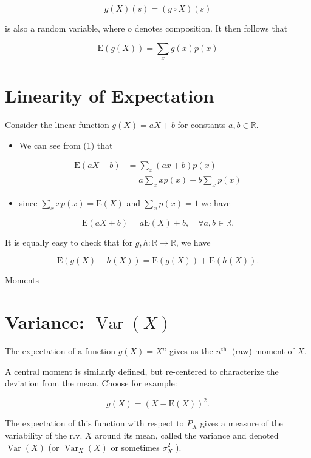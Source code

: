 \documentclass[10pt]{article}
\begin{document}
$$
g(X)(s)=(g \circ X)(s)
$$

is also a random variable, where o denotes composition. It then follows that


\begin{equation*}
\mathrm{E}(g(X))=\sum_{x} g(x) p(x) \tag{1}
\end{equation*}


\section*{Linearity of Expectation}
Consider the linear function $g(X)=a X+b$ for constants $a, b \in \mathbb{R}$.

\begin{itemize}
  \item We can see from (1) that
\end{itemize}

$$
\begin{aligned}
\mathrm{E}(a X+b) & =\sum_{x}(a x+b) p(x) \\
& =a \sum_{x} x p(x)+b \sum_{x} p(x)
\end{aligned}
$$

\begin{itemize}
  \item since $\sum_{x} x p(x)=\mathrm{E}(X)$ and $\sum_{x} p(x)=1$ we have
\end{itemize}

$$
\mathrm{E}(a X+b)=a \mathrm{E}(X)+b, \quad \forall a, b \in \mathbb{R} .
$$

It is equally easy to check that for $g, h: \mathbb{R} \rightarrow \mathbb{R}$, we have

$$
\mathrm{E}(g(X)+h(X))=\mathrm{E}(g(X))+\mathrm{E}(h(X)) .
$$

Moments

\section*{Variance: $\operatorname{Var}(X)$}
The expectation of a function $g(X)=X^{n}$ gives us the $n^{\text {th }}$ (raw) moment of $X$.

A central moment is similarly defined, but re-centered to characterize the deviation from the mean. Choose for example:

$$
g(X)=(X-\mathrm{E}(X))^{2} .
$$

The expectation of this function with respect to $P_{X}$ gives a measure of the variability of the r.v. $X$ around its mean, called the variance and denoted $\operatorname{Var}(X)$ (or $\operatorname{Var}_{X}(X)$ or sometimes $\sigma_{X}^{2}$ ).
\end{document}
